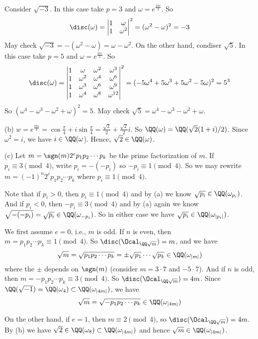\documentclass[../Chapter.tex]{subfiles}
\begin{document}
Consider $\sqrt{-3}$. In this case take $p=3$ and $\omega=e^{\frac{2\pi i}{3}}$. So $$\disc(\omega)=
\begin{vmatrix}
1 & \omega \\
1 & \omega^2
\end{vmatrix}^2
=(\omega^2-\omega)^2=-3$$
May check $\sqrt{-3}=-(\omega^2-\omega)=\omega-\omega^2$.
On the other hand, condiser $\sqrt{5}$. In this case take $p=5$ and $\omega=e^{\frac{2\pi i}{5}}$. So $$\disc(\omega)=
\begin{vmatrix}
1 & \omega & \omega^2 & \omega^3 \\
1 & \omega^2 & \omega^4 & \omega^6 \\
1 & \omega^3 & \omega^6 & \omega^9 \\
1 & \omega^4 & \omega^8 & \omega^{12} 
\end{vmatrix}^2=(-5\omega^4+5\omega^3+5\omega^2-5\omega)^2=5^3
$$
So $(\omega^4-\omega^3-\omega^2+\omega)^2=5$. May check $\sqrt{5}=\omega^4-\omega^3-\omega^2+\omega$.

(b) $w=e^\frac{2\pi i}{8}=\cos\frac{\pi}{4}+i\sin\frac{\pi}{4}=\frac{\sqrt{2}}{2}+\frac{\sqrt{2}}{2}i$. So $\QQ(\omega)=\QQ(\sqrt{2}(1+i)/2)$. Since $\omega^2=i$, we have $i\in\QQ(\omega$). Hence, $\sqrt{2}\in\QQ(\omega)$. 

(c) Let $m=\sgn(m)2^ep_1p_2\cdots p_k$ be the prime factorization of $m$. If $p_i\equiv 3 \pmod{4}$, write $p_i=-(-p_i)$ so $-p_i\equiv 1 \pmod{4}$. So we may rewrite $m=(-1)^n2^ep_1p_2\cdots p_k$ where $p_i\equiv 1 \pmod{4}$.

Note that if $p_i>0$, then $p_i\equiv 1 \pmod{4}$ and by (a) we know $\sqrt{p_i}\in\QQ(\omega_{p_i})$. And if $p_i<0$, then $-p_i\equiv 3 \pmod{4}$ and by (a) again we know $\sqrt{-(-p_i)}=\sqrt{p_i} \in\QQ(\omega_{-p_i})$. So in either case we have $\sqrt{p_i}\in\QQ(\omega_{|p_i|})$.

We first assume $e=0$, i.e., $m$ is odd. If $n$ is even, then $m=p_1p_2\cdots p_k\equiv 1 \pmod{4}$. So $\disc(\Ocal_{\QQ\sqrt{m}})=m$, and we have
$$\sqrt{m}=\sqrt{p_1p_2\cdots p_k}=\pm \sqrt{p_1}\cdots \sqrt{p_k}\in\QQ(\omega_{|m|})$$ where the $\pm$ depends on $\sgn(m)$ (consider $m=3\cdot7$ and $-5\cdot7$). And if $n$ is odd, then $m=-p_1p_2\cdots p_k\equiv 3 \pmod{4}$. So $\disc(\Ocal_{\QQ\sqrt{m}})=4m$. Since $\QQ(\sqrt{-1})=\QQ(\omega_4)\subset\QQ(\omega_{|4m|})$, we have $$\sqrt{m}=\sqrt{-p_1p_2\cdots p_k}\in\QQ(\omega_{|4m|})$$

On the other hand, if $e=1$, then $m\equiv 2\pmod{4}$, so $\disc(\Ocal_{\QQ\sqrt{m}})=4m$. By (b) we have $\sqrt{2}\in\QQ(\omega_8)\subset\QQ(\omega_{|4m|})$ and hence $\sqrt{m}\in\QQ(\omega_{|4m|})$.
 
\end{document}
